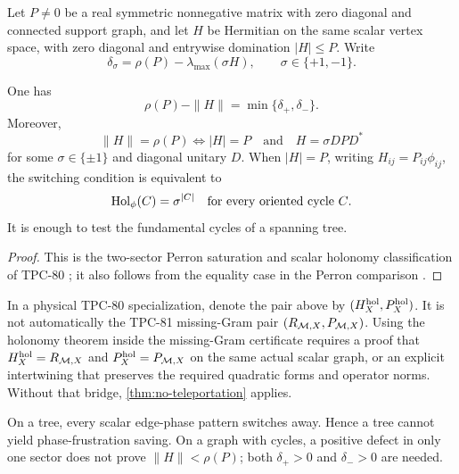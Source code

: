 Let \(P\ne0\) be a real symmetric nonnegative matrix with zero
diagonal and connected support graph, and let \(H\) be Hermitian on
the same scalar vertex space, with zero diagonal and entrywise
domination \(|H|\le P\).
Write
\[
 \delta_\sigma=\rho(P)-\lambda_{\max}(\sigma H),
 \qquad \sigma\in\{+1,-1\}.
\]

\begin{proposition}
\label{prop:tpc80-interface}
One has
\begin{equation}
 \rho(P)-\|H\|=\min\{\delta_+,\delta_-\}.
\label{eq:sector-min}
\end{equation}
Moreover,
\begin{equation}
 \|H\|=\rho(P)
 \iff
 |H|=P
 \quad\text{and}\quad
 H=\sigma DPD^*
\label{eq:perron-saturation-audit}
\end{equation}
for some \(\sigma\in\{\pm1\}\) and diagonal unitary \(D\).  When
\(|H|=P\), writing \(H_{ij}=P_{ij}\phi_{ij}\), the switching
condition is equivalent to
\begin{equation}
 \operatorname{Hol}_\phi(C)=\sigma^{|C|}
\quad\text{for every oriented cycle \(C\)}.
\label{eq:holonomy-audit}
\end{equation}
It is enough to test the fundamental cycles of a spanning tree.
\end{proposition}

\begin{proof}
This is the two-sector Perron saturation and scalar holonomy
classification of TPC-80 \citep{WangTPC80}; it also follows from the
equality case in the Perron comparison
\citep{HornJohnson2013,BermanPlemmons1994}.
\end{proof}

\begin{remark}
In a physical TPC-80 specialization, denote the pair above by
\((H_X^{\rm hol},P_X^{\rm hol})\).  It is not automatically the
TPC-81 missing-Gram pair
\((R_{\mathcal M,X},P_{\mathcal M,X})\).  Using the holonomy theorem inside the
missing-Gram certificate requires a proof that
\(H_X^{\rm hol}=R_{\mathcal M,X}\) and
\(P_X^{\rm hol}=P_{\mathcal M,X}\) on the same actual scalar graph, or an
explicit intertwining that preserves the required quadratic forms
and operator norms.  Without that bridge,
\cref{thm:no-teleportation} applies.
\end{remark}

\begin{corollary}
\label{cor:tree-two-sector}
On a tree, every scalar edge-phase pattern switches away.  Hence a
tree cannot yield phase-frustration saving.  On a graph with cycles,
a positive defect in only one sector does not prove
\(\|H\|<\rho(P)\); both \(\delta_+>0\) and \(\delta_->0\) are needed.
\end{corollary}

